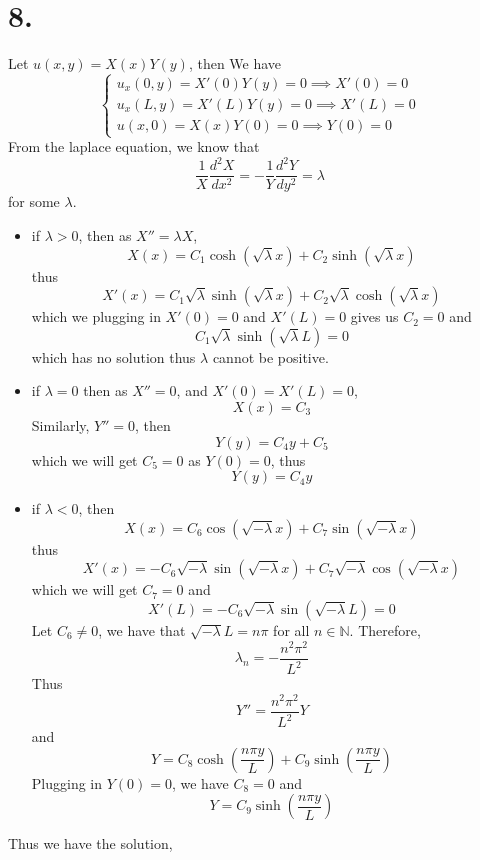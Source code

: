\documentclass[11pt]{article}
\theoremstyle{mystyle}
\theoremstyle{definition}
\begin{document}
\section*{8.}
Let $u(x,y) = X(x)Y(y)$, then 
We have
\[
  \begin{cases}
    u_x(0,y) = X'(0) Y(y) = 0 \implies X'(0) = 0 \\
    u_x(L,y) = X'(L) Y(y) = 0 \implies X'(L) = 0 \\
    u(x,0) = X(x) Y(0) = 0 \implies Y(0) = 0
  \end{cases}
\]
From the laplace equation, we know that 
\[
  \displaystyle\frac{1}{X} \displaystyle\frac{d^2X}{dx^2} = - \displaystyle\frac{1}{Y} \displaystyle\frac{d^2Y}{dy^2} = \lambda
\]
for some $\lambda$. 
\begin{itemize}
  \item if $\lambda >0$, then as $X'' = \lambda X$, 
    \[
      X(x) = C_1 \cosh(\sqrt{\lambda}x) + C_2 \sinh(\sqrt{\lambda}x)
    \]
    thus 
    \[
      X'(x) = C_1 \sqrt{\lambda} \sinh(\sqrt{\lambda}x) + C_2 \sqrt{\lambda} \cosh(\sqrt{\lambda}x)
    \]
    which we plugging in $X'(0) = 0$ and $X'(L) = 0$ gives us $C_2 = 0$ and 
    \[
      C_1 \sqrt{\lambda} \sinh(\sqrt{\lambda}L) = 0
    \]
    which has no solution thus $\lambda$ cannot be positive. 
  \item if $\lambda = 0$ then as $X'' = 0$, and $X'(0) = X'(L) = 0$,
    \[
      X(x) = C_3
    \]
    Similarly, $Y'' = 0$, then 
    \[
      Y(y) = C_4y + C_5
    \]
    which we will get $C_5 = 0$ as $Y(0) = 0$, thus 
    \[
      Y(y) = C_4y
    \]
  \item if $\lambda < 0$, then 
    \[
      X(x) = C_6 \cos(\sqrt{-\lambda}x) + C_7 \sin(\sqrt{-\lambda}x)
    \]
    thus 
    \[
      X'(x) = - C_6 \sqrt{-\lambda} \sin(\sqrt{-\lambda}x) + C_7 \sqrt{-\lambda} \cos(\sqrt{-\lambda}x)
    \]
    which we will get $C_7 = 0$ and 
    \[
      X'(L) = -C_6 \sqrt{-\lambda} \sin(\sqrt{-\lambda}L) = 0
    \]
    Let $C_6 \ne 0$, we have that 
    $\sqrt{-\lambda} L = n\pi$ for all $n \in \mathbb{N}$. Therefore, 
    \[
      \lambda_n = -\displaystyle\frac{n^2\pi^2}{L^2}
    \]
    Thus 
    \[
      Y'' = \displaystyle\frac{n^2\pi^2}{L^2}Y
    \]
    and 
    \[
      Y = C_8 \cosh \left( \displaystyle\frac{n\pi y}{L}\right) + C_9 \sinh \left(\displaystyle\frac{n\pi y}{L} \right)
    \]
    Plugging in $Y(0) = 0$, we have $C_8 = 0$ and 
    \[
      Y = C_9 \sinh\left(\displaystyle\frac{n \pi y}{L}\right)
    \]
\end{itemize}
Thus we have the solution, 
\end{document}
